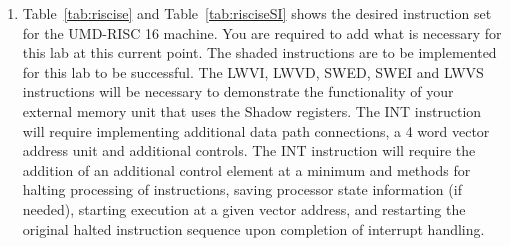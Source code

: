 \documentclass{article}
\begin{document}
\begin{enumerate}

\item Table~\ref{tab:riscise} and Table~\ref{tab:risciseSI} shows the desired instruction set for the UMD-RISC 16 machine. You are required to add what is necessary for this lab at this current point. The shaded instructions are to be implemented for this lab to be successful. The LWVI, LWVD, SWED, SWEI and LWVS instructions will be necessary to demonstrate the functionality of your external memory unit that uses the Shadow registers. The INT instruction will require implementing additional data path connections, a 4 word vector address unit and additional controls. The INT instruction will require the addition of an additional control element at a minimum and methods for halting processing of instructions, saving processor state information (if needed), starting execution at a given vector address, and restarting the original halted instruction sequence upon completion of interrupt handling.


\end{enumerate}
\end{document}
